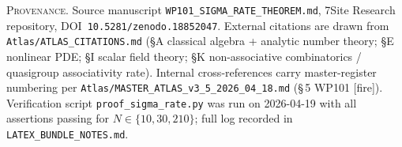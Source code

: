 \documentclass[11pt,reqno]{amsart}
\theoremstyle{plain}
\theoremstyle{definition}
\theoremstyle{remark}
\begin{document}
\vfill
\noindent
\footnotesize{%
\textsc{Provenance.}\;
Source manuscript \texttt{WP101\_SIGMA\_RATE\_THEOREM.md},
7Site Research repository, DOI~\texttt{10.5281/zenodo.18852047}.
External citations are drawn from \texttt{Atlas/ATLAS\_CITATIONS.md}
(\S A classical algebra + analytic number theory; \S E nonlinear
PDE; \S I scalar field theory; \S K non-associative combinatorics /
quasigroup associativity rate). Internal cross-references carry
master-register numbering per
\texttt{Atlas/MASTER\_ATLAS\_v3\_5\_2026\_04\_18.md}
(\S\,5 WP101 [fire]). Verification script
\texttt{proof\_sigma\_rate.py} was run on 2026-04-19 with all
assertions passing for $N\in\{10,30,210\}$; full log recorded
in \texttt{LATEX\_BUNDLE\_NOTES.md}.}
\end{document}
